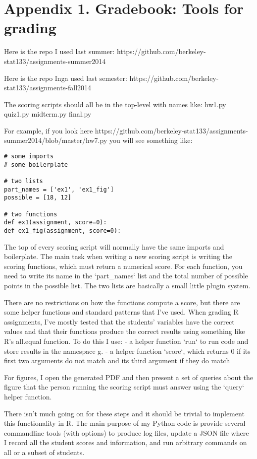 \section*{Appendix 1. Gradebook: Tools for grading}

Here is the repo I used last summer:
https://github.com/berkeley-stat133/assignments-summer2014

Here is the repo Inga used last semester:
https://github.com/berkeley-stat133/assignments-fall2014

The scoring scripts should all be in the top-level with names like:
hw1.py
quiz1.py
midterm.py
final.py

For example, if you look here
  https://github.com/berkeley-stat133/assignments-summer2014/blob/master/hw7.py
you will see something like:

\begin{verbatim}
# some imports
# some boilerplate

# two lists
part_names = ['ex1', 'ex1_fig']
possible = [18, 12]

# two functions
def ex1(assignment, score=0):
def ex1_fig(assignment, score=0):
\end{verbatim}

The top of every scoring script will normally have the same imports
and boilerplate.  The main task when writing a new scoring script is
writing the scoring functions, which must return a numerical score.
For each function, you need to write its name in the `part\_names` list
and the total number of possible points in the possible list.  The
two lists are basically a small little plugin system.

There are no restrictions on how the functions compute a score, but
there are some helper functions and standard patterns that I've used.
When grading R assignments, I've mostly tested that the students'
variables have the correct values and that their functions produce the
correct results using something like R's all.equal function.  To do
this I use:
- a helper function `run` to run code and store results in the namespace g.
- a helper function `score`, which returns 0 if its first two
arguments do not match and its third argument if they do match

For figures, I open the generated PDF and then present a set of
queries about the figure that the person running the scoring script
must answer using the `query` helper function.

There isn't much going on for these steps and it should be trivial to
implement this functionality in R.  The main purpose of my Python code
is provide several commandline tools (with options) to produce log
files, update a JSON file where I record all the student scores and
information, and run arbitrary commands on all or a subset of
students.

